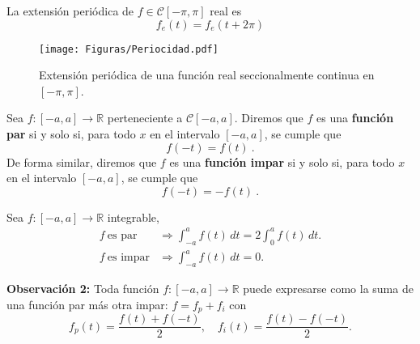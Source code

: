 \begin{ejemplo}
La extensión periódica de $f \in \mathscr{C}[-\pi,\pi]$ real es
$$f_e(t) = f_e(t + 2\pi)$$

\begin{figure}[H]
    \centering
    \texttt{[image: Figuras/Periocidad.pdf]}
    \caption{Extensión periódica de una función real seccionalmente continua en $[-\pi,\pi]$.}
\end{figure}
\end{ejemplo}

 
\begin{defi} 
Sea $f: [-a,a] \longrightarrow \mathbb{R}$ perteneciente a $\mathscr{C}[-a,a]$.
Diremos que $f$ es una \textbf{función par} si y solo si, para todo $x$ en el intervalo $[-a,a]$, se cumple que
\begin{equation}
    f(-t) = f(t) \ .
\end{equation}
De forma similar, diremos que $f$ es una \textbf{función impar} si y solo si, para todo $x$ en el intervalo $[-a,a]$, se cumple que
\vspace{-0.1cm}
\begin{equation}
     f(-t) = -f(t) \ .
\end{equation}
\end{defi} 


\begin{propo}
    Sea $f: [-a,a] \longrightarrow \mathbb{R}$ integrable,
    \begin{align*}
        f ~\mbox{es par} &\Rightarrow \int_{-a}^a f(t) \,dt = 2 \int_0^a f(t) \,dt. \\
        f ~\mbox{es impar} &\Rightarrow \int_{-a}^a f(t) \,dt = 0.
    \end{align*}
\end{propo}

\textbf{Observación 2:} Toda función $f:[-a,a] \longrightarrow \mathbb{R}$ puede expresarse como la suma de una función par más otra impar: $f = f_p + f_i$ con 
$$f_p(t) = \frac{f(t) + f(-t)}{2}, \quad f_i(t) = \frac{f(t) - f(-t)}{2}.$$

